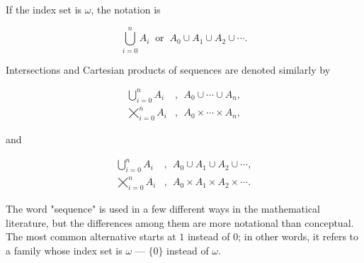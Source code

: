 If the index set is $ \omega $, the notation is 

\begin{equation*}
\bigcup_{i = 0}^{n} A_{i} \: \text{ or } \: A_{0} \cup A_{1} \cup A_{2} \cup \cdots .
\end{equation*}

Intersections and Cartesian products of sequences are denoted similarly by

\begin{align*}
\bigcup_{i = 0}^{n} A_{i} &, \: \: A_{0}\cup \cdots \cup A_{n}, \\
\bigtimes_{i = 0}^{n} A_{i} &, \: \: A_{0}\times \cdots \times A_{n},
\end{align*}

and

\begin{align*}
\bigcup_{i = 0}^{n} A_{i} &, \: \: A_{0} \cup A_{1} \cup A_{2} \cup \cdots , \\
\bigtimes_{i = 0}^{n} A_{i} &, \:  \: A_{0} \times A_{1} \times A_{2} \times \cdots .
\end{align*}

The word "sequence" is used in a few different ways in the mathematical literature, but the differences among them are more notational than conceptual. The most common alternative starts at $1$ instead of $0$; in other words, it refers to a family whose index set is $ \omega $ — $\{ 0 \}$ instead of $ \omega $.